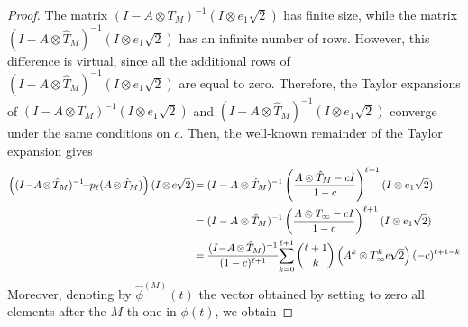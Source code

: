 \documentclass[final,1p,times,number]{elsarticle}
\theoremstyle{plain}%
\begin{document}
\begin{proof}
The matrix \( (I - A \otimes T_{M})^{-1}  (I \otimes e_1 \sqrt{2})\) has finite size, while the matrix \( (I - A \otimes \hat{T}_{M})^{-1}  (I \otimes e_1 \sqrt{2})\) has an infinite number of rows. However, this difference is virtual, since all the additional rows of \( (I - A \otimes \hat{T}_{M})^{-1}  (I \otimes e_1 \sqrt{2})\) are equal to zero.
Therefore, the Taylor expansions of \( (I - A \otimes T_{M})^{-1}  (I \otimes e_1 \sqrt{2})\) and \( (I - A \otimes \hat{T}_{M})^{-1}  (I \otimes e_1 \sqrt{2})\) converge under the same conditions on \(c\). Then, the well-known remainder of the Taylor expansion gives
\begin{align*}
\left( (I\hspace{-2pt}-\hspace{-2pt}A\hspace{-1pt}\otimes\hspace{-1pt}\hat{T}_{M})^{-1}\hspace{-4pt}-\hspace{-3pt}p_\ell(A\hspace{-1pt}\otimes\hspace{-1pt}\hat{T}_{M}) \right) (I\hspace{-1pt}\otimes\hspace{-1pt} e_1\hspace{-5pt} \sqrt{2})\hspace{-2pt} &=  (I-A \otimes \hat{T}_{M})^{-1}   \left( \frac{A\otimes \hat{T}_{M} - cI}{1-c} \right)^{\ell+1} (I \otimes e_1 \sqrt{2}) \\
&=  (I-A \otimes \hat{T}_{M})^{-1}   \left( \frac{A\otimes {T}_{\infty} - cI}{1-c} \right)^{\ell+1} (I \otimes e_1 \sqrt{2}) \\
&=  \frac{(I\hspace{-2pt}-\hspace{-2pt}A\hspace{-1pt}\otimes\hspace{-1pt}\hat{T}_{M})^{-1}}{(1-c)^{\ell+1}} \hspace{-2pt} \sum_{k=0}^{\ell+1} \binom{\ell+1}{k} \left( A^k\otimes {T}_{\infty}^k e_1\hspace{-5pt} \sqrt{2}\right) (-c)^{\ell+1-k} 
\end{align*}
Moreover, denoting by \(\hat{\phi}^{(M)}(t)\) the vector obtained by setting to zero all elements after the $M$-th one in $\phi(t)$, we obtain

\end{proof}
\end{document}
